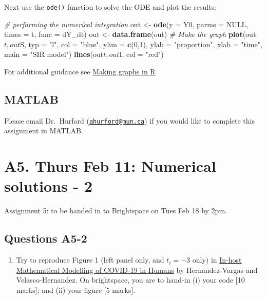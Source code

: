 \documentclass[]{book}
\newenvironment{Shaded}{\begin{snugshade}}{\end{snugshade}}
\newcommand{\KeywordTok}[1]{\textcolor[rgb]{0.13,0.29,0.53}{\textbf{{#1}}}}
\newcommand{\DataTypeTok}[1]{\textcolor[rgb]{0.13,0.29,0.53}{{#1}}}
\newcommand{\DecValTok}[1]{\textcolor[rgb]{0.00,0.00,0.81}{{#1}}}
\newcommand{\StringTok}[1]{\textcolor[rgb]{0.31,0.60,0.02}{{#1}}}
\newcommand{\CommentTok}[1]{\textcolor[rgb]{0.56,0.35,0.01}{\textit{{#1}}}}
\newcommand{\OtherTok}[1]{\textcolor[rgb]{0.56,0.35,0.01}{{#1}}}
\newcommand{\NormalTok}[1]{{#1}}
\providecommand{\tightlist}{%
  \setlength{\itemsep}{0pt}\setlength{\parskip}{0pt}}
\begin{document}
Next use the \texttt{ode()} function to solve the ODE and plot the
results:

\begin{Shaded}
\begin{Highlighting}[]
\CommentTok{# performing the numerical integration}
\NormalTok{out <-}\StringTok{ }\KeywordTok{ode}\NormalTok{(}\DataTypeTok{y =} \NormalTok{Y0, }\DataTypeTok{parms =} \OtherTok{NULL}\NormalTok{, }\DataTypeTok{times =} \NormalTok{t, }\DataTypeTok{func =} \NormalTok{dY_dt)}
\NormalTok{out <-}\StringTok{ }\KeywordTok{data.frame}\NormalTok{(out)}
\CommentTok{# Make the graph}
\KeywordTok{plot}\NormalTok{(out$t, out$S, }\DataTypeTok{typ =} \StringTok{"l"}\NormalTok{, }\DataTypeTok{col =} \StringTok{"blue"}\NormalTok{, }\DataTypeTok{ylim =} \KeywordTok{c}\NormalTok{(}\DecValTok{0}\NormalTok{,}\DecValTok{1}\NormalTok{), }\DataTypeTok{ylab =} \StringTok{"proportion"}\NormalTok{, }\DataTypeTok{xlab =} \StringTok{"time"}\NormalTok{, }\DataTypeTok{main =} \StringTok{"SIR model"}\NormalTok{)}
\KeywordTok{lines}\NormalTok{(out$t, out$I, }\DataTypeTok{col =} \StringTok{"red"}\NormalTok{)}
\end{Highlighting}
\end{Shaded}

For additional guidance see
\href{https://ahurford.github.io/quant-guide-all-courses/graph.html}{Making
graphs in R}

\section{MATLAB}\label{matlab}

Please email Dr.~Hurford
(\href{mailto:ahurford@mun.ca}{\nolinkurl{ahurford@mun.ca}}) if you
would like to complete this assignment in MATLAB.

\chapter{A5. Thurs Feb 11: Numerical solutions -
2}\label{a5.-thurs-feb-11-numerical-solutions---2}

Assignment 5: to be handed in to Brightspace on Tues Feb 18 by 2pm.

\section{Questions A5-2}\label{questions-a5-2}

\begin{enumerate}
\def\labelenumi{\arabic{enumi}.}
\setcounter{enumi}{1}
\tightlist
\item
  Try to reproduce Figure 1 (left panel only, and \(t_i = -3\) only) in
  \href{https://www-ncbi-nlm-nih-gov.qe2a-proxy.mun.ca/pmc/articles/PMC7526677/}{In-host
  Mathematical Modelling of COVID-19 in Humans} by Hernandez-Vargas and
  Velasco-Hernandez. On brightspace, you are to hand-in (i) your code
  {[}10 marks{]}; and (ii) your figure {[}5 marks{]}.
\end{enumerate}
\end{document}
